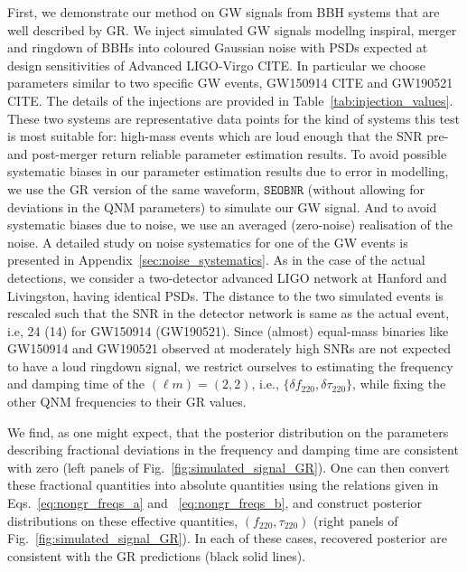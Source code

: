 \documentclass[twocolumn,prd,aps,superscriptaddress,preprintnumbers,tightenlines,showpacs,nofootinbib,eqsecnum,amsfonts,amsmath]{revtex4-1}
\newcommand{\df}[1]{\delta f_{\text{#1}}}
\newcommand{\dtau}[1]{\delta \tau_{\text{#1}}}
\newcommand{\fngr}[1]{f_{\text{#1}}}
\newcommand{\taungr}[1]{\tau_{\text{#1}}}
\newcommand{\SEOB}{\texttt{SEOBNR}}
\begin{document}
First, we demonstrate our method on GW signals from BBH systems that are well described by GR. We inject simulated GW signals modellng inspiral, merger and ringdown of BBHs into coloured Gaussian noise with PSDs expected at design sensitivities of Advanced LIGO-Virgo CITE. In particular we choose parameters similar to two specific GW events, GW150914 CITE and GW190521 CITE. The details of the injections are provided in Table~\ref{tab:injection_values}. These two systems are representative data points for the kind of systems this test is most suitable for: high-mass events which are loud enough that the SNR pre- and post-merger return reliable parameter estimation results. To avoid possible systematic biases in our parameter estimation results due to error in modelling, we use the GR version of the same waveform, $\SEOB$ (without allowing for deviations in the QNM parameters) to simulate our GW signal. And to avoid systematic biases due to noise, we use an averaged (zero-noise) realisation of the noise. A detailed study on noise systematics for one of the GW events is presented in Appendix~\ref{sec:noise_systematics}. As in the case of the actual detections, we consider a two-detector advanced LIGO network at Hanford and Livingston, having identical PSDs. The distance to the two simulated events is rescaled such that the SNR in the detector network is same as the actual event, i.e, 24 (14) for GW150914 (GW190521). Since (almost) equal-mass binaries like GW150914 and GW190521 observed at moderately high SNRs are not expected to have a loud ringdown signal, we restrict ourselves to estimating the frequency and damping time of the $(\ell m) = (2,2)$, i.e., $\{\df{220},\dtau{220}\}$, while fixing the other QNM frequencies to their GR values. 

We find, as one might expect, that the posterior distribution on the parameters describing fractional deviations in the frequency and damping time are consistent with zero (left panels of Fig.~\ref{fig:simulated_signal_GR}). One can then convert these fractional quantities into absolute quantities using the relations given in Eqs.~\ref{eq:nongr_freqs_a} and ~\ref{eq:nongr_freqs_b}, and construct posterior distributions on these effective quantities, $(\fngr{220}, \taungr{220})$ (right panels of Fig.~\ref{fig:simulated_signal_GR}). In each of these cases, recovered posterior are consistent with the GR predictions (black solid lines).
\end{document}

